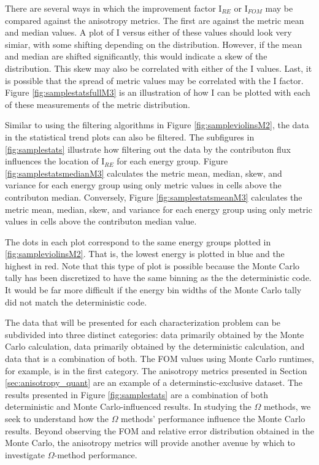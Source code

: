 There are several ways in which the improvement
factor I$_{RE}$ or I$_{FOM}$ may be compared against the anisotropy metrics. The
first are against the metric mean and median values. A plot of I versus either
of these values should look very simiar, with some shifting depending on the
distribution. However, if the mean and median are shifted significantly, this
would indicate a skew of the distribution. This skew may also be correlated with
either
of the I values. Last, it is possible that the spread of metric values may be
correlated with the I factor. Figure \ref{fig:samplestatsfullM3} is an
illustration of how I can be plotted with
each of these measurements of the metric distribution.

Similar to using the filtering algorithms in Figure
\ref{fig:sampleviolinsM2}, the data in the statistical trend plots can also be
filtered. The subfigures in \ref{fig:samplestats} illustrate how filtering out
the data by the contributon flux influences the location of I$_{RE}$ for each
energy group. Figure \ref{fig:samplestatsmedianM3} calculates the
metric mean, median, skew, and variance for each energy group using only metric
values in cells above the contributon median. Conversely, Figure
\ref{fig:samplestatsmeanM3} calculates the metric mean, median, skew, and
variance for each energy group using only metric values in cells above the
contributon median value.

The dots in each plot correspond to the same energy
groups plotted in \ref{fig:sampleviolinsM2}. That is, the lowest energy is
plotted in blue and the highest in red. Note that this type of plot is
possible because the Monte Carlo tally has been discretized to have
the same binning as the the deterministic code. It would be far more difficult
if the energy bin widths of the Monte Carlo tally did not match the
deterministic code.

The data that will be presented for each characterization problem
can be subdivided into three distinct
categories: data primarily obtained by the Monte Carlo calculation, data
primarily obtained by the deterministic calculation, and data that is a
combination of both. The FOM values using Monte Carlo runtimes, for example, is
in the first category. The anisotropy metrics presented in Section
\ref{sec:anisotropy_quant} are an example of a determinstic-exclusive dataset.
The results presented in Figure \ref{fig:samplestats} are a combination of both
deterministic and Monte Carlo-influenced results. In studying the $\Omega$
methods, we seek to understand how the $\Omega$ methods' performance influence
the Monte Carlo results. Beyond observing the FOM and relative error
distribution obtained in the Monte Carlo, the anisotropy metrics will provide
another avenue by which to investigate $\Omega$-method performance.

